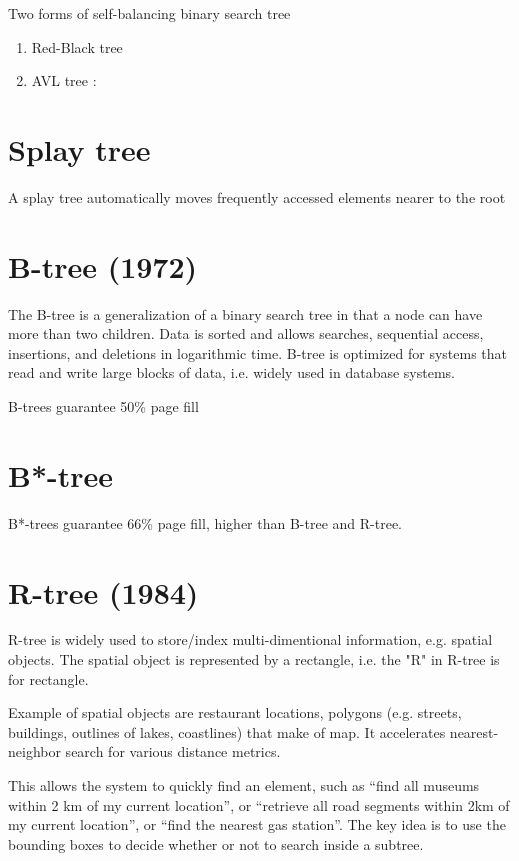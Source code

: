 Two forms of self-balancing binary search tree
\begin{enumerate}
  \item Red-Black tree
  \item AVL tree :
\end{enumerate}

\section{Splay tree}
\label{sec:tree_splay}

A splay tree automatically moves frequently accessed elements nearer to the root
 
 
\section{B-tree (1972)}
\label{sec:tree_B}

The B-tree is a generalization of a binary search tree in that a node can have
more than two children.
Data is sorted and allows searches, sequential access, insertions, and deletions
in logarithmic time.
B-tree is optimized for systems that read and write large blocks of data, i.e.
widely used in database systems.

B-trees guarantee 50\% page fill

\section{B*-tree}

B*-trees guarantee 66\% page fill, higher than B-tree and R-tree.

\section{R-tree (1984)}
\label{sec:tree_R}


R-tree is widely used to store/index multi-dimentional information, e.g. spatial
objects. The spatial object is represented by a rectangle, i.e. the "R" in R-tree is for rectangle.

Example of spatial objects are restaurant locations, polygons (e.g. streets,
buildings, outlines of lakes, coastlines) that make of map.
It accelerates nearest-neighbor search for various distance metrics.

This allows the system to quickly find an element, such as ``find all museums
within 2 km of my current location'', or ``retrieve all road segments within 2km
of my current location'', or ``find the nearest gas station''. The key idea is
to use the bounding boxes to decide whether or not to search inside a subtree.

